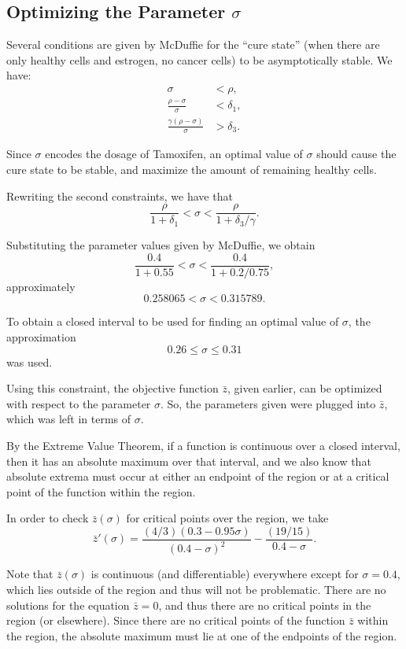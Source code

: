 \documentclass[12pt]{article}
\begin{document}
\subsection{Optimizing the Parameter \(\sigma\)}

\indent\indent Several conditions are given by McDuffie for the ``cure state'' (when there are only healthy cells and estrogen, no cancer cells) to be asymptotically stable. We have:
\begin{align*}
    \sigma &< \rho, \\
    \frac{\rho - \sigma}{\sigma} &< \delta_1, \\
    \frac{\gamma(\rho - \sigma)}{\sigma} &>\delta_3.
\end{align*}

Since \(\sigma\) encodes the dosage of Tamoxifen, an optimal value of \(\sigma\) should cause the cure state to be stable, and maximize the amount of remaining healthy cells. 

Rewriting the second constraints, we have that
\[\frac{\rho}{1+\delta_1} < \sigma < \frac{\rho}{1+\delta_3/\gamma}. \]

Substituting the parameter values given by McDuffie, we obtain
\[\frac{0.4}{1+0.55} < \sigma < \frac{0.4}{1+0.2/0.75},\]
approximately
\[0.258065 < \sigma < 0.315789.\]

To obtain a closed interval to be used for finding an optimal value of \(\sigma\), the approximation 
\[0.26 \leq \sigma \leq 0.31\]
was used.

Using this constraint, the objective function \(\bar{z}\), given earlier, can be optimized with respect to the parameter \(\sigma\). So, the parameters given were plugged into \(\bar{z}\), which was left in terms of \(\sigma\). 

By the Extreme Value Theorem, if a function is continuous over a closed interval, then it has an absolute maximum over that interval, and we also know that absolute extrema must occur at either an endpoint of the region or at a critical point of the function within the region.

In order to check \(\bar{z}(\sigma)\) for critical points over the region, we take
\[\bar{z}'(\sigma) = \frac{(4/3)(0.3-0.95\sigma)}{(0.4-\sigma)^2}-\frac{(19/15)}{0.4-\sigma}.\]

Note that \(\bar{z}(\sigma)\) is continuous (and differentiable) everywhere except for \(\sigma = 0.4\), which lies outside of the region and thus will not be problematic. There are no solutions for the equation \(\bar{z}=0\), and thus there are no critical points in the region (or elsewhere). Since there are no critical points of the function \(\bar{z}\) within the region, the absolute maximum must lie at one of the endpoints of the region.
\end{document}
